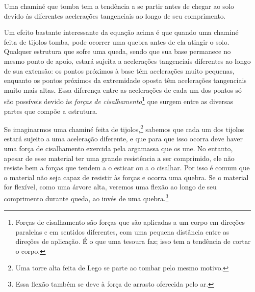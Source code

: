 \begin{marginfigure}
\centering
{}
\caption{Uma chaminé que tomba tem a tendência a se partir antes de chegar ao solo devido às diferentes acelerações tangenciais ao longo de seu comprimento.}
\end{marginfigure}

Um efeito bastante interessante da equação acima é que quando uma chaminé feita de tijolos tomba, pode ocorrer uma quebra antes de ela atingir o solo. Qualquer estrutura que sofre uma queda, sendo que sua base permanece no mesmo ponto de apoio, estará sujeita a acelerações tangenciais diferentes ao longo de sua extensão: os pontos próximos à base têm acelerações muito pequenas, enquanto os pontos próximos da extremidade oposta têm acelerações tangenciais muito mais altas. Essa diferença entre as acelerações de cada um dos pontos só são possíveis devido às \emph{forças de cisalhamento}\footnote{Forças de cisalhamento são forças que são aplicadas a um corpo em direções paralelas e em sentidos diferentes, com uma pequena distância entre as direções de aplicação. É o que uma tesoura faz; isso tem a tendência de cortar o corpo.} que surgem entre as diversas partes que compõe a estrutura.

Se imaginarmos uma chaminé feita de tijolos,\footnote{Uma torre alta feita de Lego se parte ao tombar pelo mesmo motivo.} sabemos que cada um dos tijolos estará sujeito a uma aceleração diferente, e que para que isso ocorra deve haver uma força de cisalhamento exercida pela argamassa que os une. No entanto, apesar de esse material ter uma grande resistência a ser comprimido, ele não resiste bem a forças que tendem a o esticar ou a o cisalhar. Por isso é comum que o material não seja capaz de resistir às forças e ocorra uma quebra. Se o material for flexível, como uma árvore alta, veremos uma flexão ao longo de seu comprimento durante queda, ao invés de uma quebra.\footnote{Essa flexão também se deve à força de arrasto oferecida pelo ar.}

